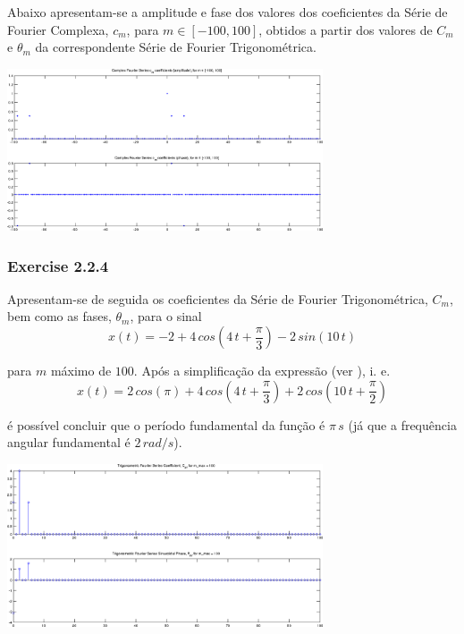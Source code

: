 \documentclass[a4paper]{article}
\begin{document}
\noindent Abaixo apresentam-se a amplitude e fase dos valores dos coeficientes da Série de Fourier Complexa, $c_m$, para $m \in [-100, 100]$, obtidos a partir dos valores de $C_m$ e $\theta_m$ da correspondente Série de Fourier Trigonométrica.
\begin{center}
	\includegraphics[width=0.70\textwidth]{images/ex2_2_3_complex_cm.png}
	\label{fig:ex2_2_3_complex_cm}
\end{center}

\subsubsection{Exercise 2.2.4}
\label{subsubsec:ex_2_2_4}
\noindent Apresentam-se de seguida os coeficientes da Série de Fourier Trigonométrica, $C_m$, bem como as fases, $\theta_m$, para o sinal
\begin{equation}
	x(t) = -2 + 4 \, cos\left(4 \, t + \frac{\pi}{3}\right) - 2 \, sin(10 \, t)
\end{equation}

\noindent para $m$ máximo de $100$. Após a simplificação da expressão (ver \emph{}), i. e.
\begin{equation}
	x(t) = 2 \, cos(\pi) + 4 \, cos\left(4 \, t + \frac{\pi}{3}\right) + 2 \, cos\left(10 \, t + \frac{\pi}{2}\right)
	\label{eq:ex_2_2_4}
\end{equation}

\noindent é possível concluir que o período fundamental da função é $\pi \, s$ (já que a frequência angular fundamental é $2 \, rad/s$).

\begin{center}
	\includegraphics[width=0.70\textwidth]{images/ex2_2_4_cm_tm.png}
	\label{fig:ex2_2_4_cm_tm}
\end{center}
\end{document}

